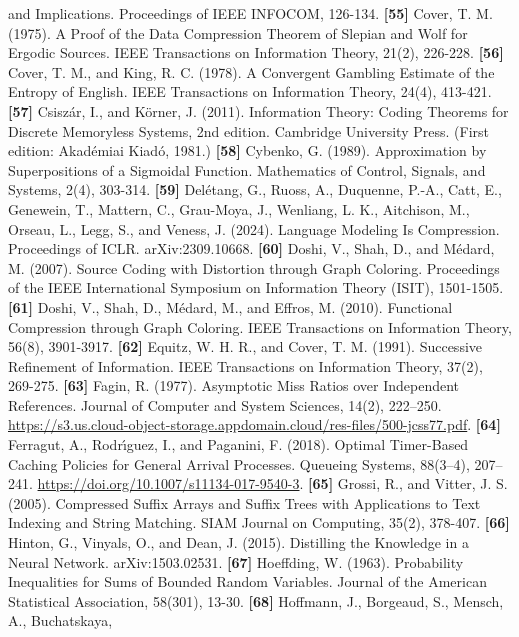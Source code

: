 \documentclass[
]{article}
\begin{document}
and Implications. Proceedings of IEEE INFOCOM, 126-134.
\textbf{{[}55{]}} Cover, T. M. (1975). A Proof of the Data Compression
Theorem of Slepian and Wolf for Ergodic Sources. IEEE Transactions on
Information Theory, 21(2), 226-228.
\textbf{{[}56{]}} Cover, T. M., and King, R. C. (1978). A Convergent
Gambling Estimate of the Entropy of English. IEEE Transactions on
Information Theory, 24(4), 413-421.
\textbf{{[}57{]}} Csisz\'ar, I., and K\"orner, J. (2011). Information
Theory: Coding Theorems for Discrete Memoryless Systems, 2nd edition.
Cambridge University Press. (First edition: Akad\'emiai Kiad\'o, 1981.)
\textbf{{[}58{]}} Cybenko, G. (1989). Approximation by Superpositions
of a Sigmoidal Function. Mathematics of Control, Signals, and Systems,
2(4), 303-314.
\textbf{{[}59{]}} Del\'etang, G., Ruoss, A., Duquenne, P.-A., Catt, E.,
Genewein, T., Mattern, C., Grau-Moya, J., Wenliang, L. K.,
Aitchison, M., Orseau, L., Legg, S., and Veness, J. (2024). Language
Modeling Is Compression. Proceedings of ICLR. arXiv:2309.10668.
\textbf{{[}60{]}} Doshi, V., Shah, D., and M\'edard, M. (2007). Source
Coding with Distortion through Graph Coloring. Proceedings of the IEEE
International Symposium on Information Theory (ISIT), 1501-1505.
\textbf{{[}61{]}} Doshi, V., Shah, D., M\'edard, M., and Effros, M.
(2010). Functional Compression through Graph Coloring. IEEE
Transactions on Information Theory, 56(8), 3901-3917.
\textbf{{[}62{]}} Equitz, W. H. R., and Cover, T. M. (1991). Successive
Refinement of Information. IEEE Transactions on Information Theory,
37(2), 269-275.
\textbf{{[}63{]}} Fagin, R. (1977). Asymptotic Miss Ratios
over Independent References. Journal of Computer and System Sciences,
14(2), 222--250. \url{https://s3.us.cloud-object-storage.appdomain.cloud/res-files/500-jcss77.pdf}.
\textbf{{[}64{]}} Ferragut, A., Rodr{\'\i}guez, I., and Paganini, F.
(2018). Optimal Timer-Based Caching Policies for General Arrival
Processes. Queueing Systems, 88(3--4), 207--241.
\url{https://doi.org/10.1007/s11134-017-9540-3}.
\textbf{{[}65{]}} Grossi, R., and Vitter, J. S. (2005). Compressed
Suffix Arrays and Suffix Trees with Applications to Text Indexing and
String Matching. SIAM Journal on Computing, 35(2), 378-407.
\textbf{{[}66{]}} Hinton, G., Vinyals, O., and Dean, J. (2015).
Distilling the Knowledge in a Neural Network. arXiv:1503.02531.
\textbf{{[}67{]}} Hoeffding, W. (1963). Probability Inequalities for
Sums of Bounded Random Variables. Journal of the American Statistical
Association, 58(301), 13-30.
\textbf{{[}68{]}} Hoffmann, J., Borgeaud, S., Mensch, A., Buchatskaya,
\end{document}
